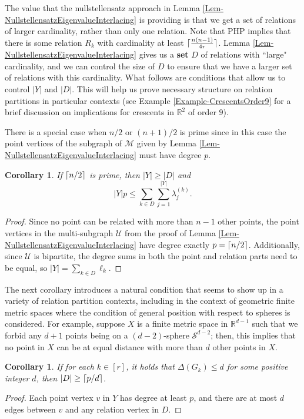 \documentclass[12pt]{article}
\newcommand{\R}{\mathbb{R}}
\DeclarePairedDelimiter\ceil{\lceil}{\rceil}
\newtheorem{cor}[thm]{Corollary}
\theoremstyle{definition}
\begin{document}
	
	
	The value that the nullstellensatz approach in Lemma \ref{Lem-NullstellensatzEigenvalueInterlacing} is providing is that we get a set of relations of larger cardinality, rather than only one relation.  Note that PHP implies that there is some relation $R_k$ with cardinality at least $\ceil{\tfrac{n(n-1)}{4r}}$. Lemma \ref{Lem-NullstellensatzEigenvalueInterlacing} gives us a \textbf{set} $D$ of relations with ``large" cardinality, and we can control the size of $D$ to ensure that we have a larger set of relations with this cardinality.  What follows are conditions that allow us to control $|Y|$ and $|D|$.  This will help us prove necessary structure on relation partitions in particular contexts (see Example \ref{Example-CrescentsOrder9} for a brief discussion on implications for crescents in $\R^2$ of order $9$).  %
	
	There is a special case when $n/2$ or $(n+1)/2$ is prime since in this case the point vertices of the subgraph of $\mathcal{M}$ given by Lemma \ref{Lem-NullstellensatzEigenvalueInterlacing} must have degree $p$.
	
	\begin{cor}
		If $\ceil{n/2}$ is prime, then $|Y| \geq |D|$ and 
		$$|Y| p \leq \sum_{k \in D}\sum_{j =1}^{|Y|}\lambda_j^{(k)}.$$
	\end{cor}
	\begin{proof}
		Since no point can be related with more than $n-1$ other points, the point vertices in the multi-subgraph $\mathcal{U}$ from the proof of Lemma \ref{Lem-NullstellensatzEigenvalueInterlacing} have degree exactly $p = \ceil{n/2}$.  Additionally, since $\mathcal{U}$ is bipartite, the degree sums in both the point and relation parts need to be equal, so $|Y| = \sum_{k \in D}\ell_k$. \qedhere
	\end{proof}

	The next corollary introduces a natural condition that seems to show up in a variety of relation partition contexts, including in the context of geometric finite metric spaces where the condition of general position with respect to spheres is considered.  For example, suppose $X$ is a finite metric space in $\R^{d-1}$ such that we forbid any $d+1$ points being on a $(d-2)$-sphere $\mathcal{S}^{d-2}$; then, this implies that no point in $X$ can be at equal distance with more than $d$ other points in $X$.
	\begin{cor}
		If for each $k \in [r]$, it holds that $\Delta(G_k) \leq d$ for some positive integer $d$, then $|D| \geq \ceil{p/d}$.
	\end{cor}
	\begin{proof}
		Each point vertex $v$ in $Y$ has degree at least $p$, and there are at most $d$ edges between $v$ and any relation vertex in $D$. \qedhere
	\end{proof}
	
\end{document}
